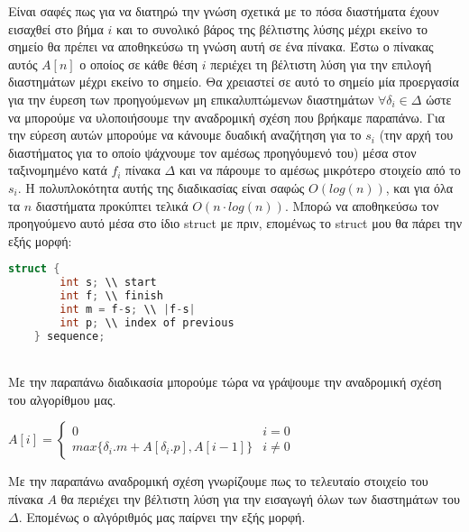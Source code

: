 \documentclass{article} \usepackage[greek,english]{babel}
\begin{document}
Είναι σαφές πως για να διατηρώ την γνώση σχετικά με το πόσα διαστήματα έχουν εισαχθεί στο βήμα $i$
και το συνολικό βάρος της βέλτιστης λύσης μέχρι εκείνο το σημείο θα πρέπει να αποθηκεύσω τη γνώση 
αυτή σε ένα πίνακα. Έστω ο πίνακας αυτός $A[n]$ ο οποίος σε κάθε θέση $i$ περιέχει τη βέλτιστη λύση 
για την επιλογή διαστημάτων μέχρι εκείνο το σημείο. Θα χρειαστεί σε αυτό το σημείο μία προεργασία 
για την έυρεση των προηγούμενων μη επικαλυπτώμενων διαστημάτων $\forall \delta_i \in \Delta$ ώστε 
να μπορούμε να υλοποιήσουμε την αναδρομική σχέση που βρήκαμε παραπάνω. Για την εύρεση αυτών μπορούμε
να κάνουμε δυαδική αναζήτηση για το $s_i$ (την αρχή του διαστήματος για το οποίο ψάχνουμε τον αμέσως
προηγόυμενό του) μέσα στον ταξινομημένο κατά $f_i$ πίνακα $\Delta$ και να πάρουμε το αμέσως μικρότερο στοιχείο 
από το $s_i$. Η πολυπλοκότητα αυτής της διαδικασίας είναι σαφώς $Ο(log(n))$, και για όλα τα $n$ 
διαστήματα προκύπτει τελικά $O(n \cdot log(n))$. Μπορώ να αποθηκεύσω τον προηγούμενο αυτό μέσα στο ίδιο
struct με πριν, επομένως το struct μου θα πάρει την εξής μορφή: \\

\begin{lstlisting}[language=C++]
    struct { 
        int s; \\ start
        int f; \\ finish
        int m = f-s; \\ |f-s|
        int p; \\ index of previous
    } sequence;
\end{lstlisting} \\

Με την παραπάνω διαδικασία μπορούμε τώρα να γράψουμε την αναδρομική σχέση του αλγορίθμου μας. \\ 

\begin{center}
    $A[i] =
    \begin{cases}
        0 & i = 0 \\
        max\{\delta_i.m + A[\delta_i.p], Α[i-1]\} & i \neq 0
    \end{cases}$ \\ 
\end{center}

Με την παραπάνω αναδρομική σχέση γνωρίζουμε πως το τελευταίο στοιχείο του πίνακα $Α$ θα περιέχει την
βέλτιστη λύση για την εισαγωγή όλων των διαστημάτων του $\Delta$. Επομένως ο αλγόριθμός μας παίρνει την
εξής μορφή. \\ 
\end{document}
